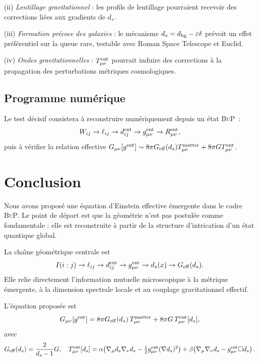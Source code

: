 \documentclass[11pt]{article}
\newcommand{\Geff}{G_{\rm eff}}
\newcommand{\BuP}{\textsc{BuP}}
\newcommand{\ent}{\rm ent}
\begin{document}
(ii) \textit{Lentillage gravitationnel} : les profils de lentillage pourraient recevoir
des corrections li\'ees aux gradients de $d_s$.

(iii) \textit{Formation pr\'ecoce des galaxies} : le m\'ecanisme $d_s=d_{\rm bg}-\varepsilon\delta$
pr\'evoit un effet pr\'ef\'erentiel sur la queue rare, testable avec Roman Space Telescope
et Euclid.

(iv) \textit{Ondes gravitationnelles} : $T_{\mu\nu}^{\ent}$ pourrait induire des
corrections \`a la propagation des perturbations m\'etriques cosmologiques.

\subsection{Programme num\'erique}

Le test d\'ecisif consistera \`a reconstruire num\'eriquement depuis un \'etat \BuP\ :
\[
W_{ij}\to\ell_{ij}\to d_{ij}^{\rm ent}\to g_{\mu\nu}^{\rm ent}\to R_{\mu\nu}^{\rm ent},
\]
puis \`a v\'erifier la relation effective
$G_{\mu\nu}[g^{\rm ent}]\sim 8\pi\Geff(d_s)T_{\mu\nu}^{\rm matter}+8\pi GT_{\mu\nu}^{\ent}$.

\section{Conclusion}
\label{sec:conclusion}

Nous avons propos\'e une \'equation d'Einstein effective \'emergente dans le cadre
\BuP. Le point de d\'epart est que la g\'eom\'etrie n'est pas postul\'ee comme
fondamentale : elle est reconstruite \`a partir de la structure d'intrication
d'un \'etat quantique global.

La cha\^{\i}ne g\'eom\'etrique centrale est
\[
I(i:j)
\rightarrow
\ell_{ij}
\rightarrow
d_{ij}^{\rm ent}
\rightarrow
g_{\mu\nu}^{\rm ent}
\rightarrow
d_s(x)
\rightarrow
\Geff(d_s).
\]
Elle relie directement l'information mutuelle microscopique \`a la m\'etrique \'emergente,
\`a la dimension spectrale locale et au couplage gravitationnel effectif.

L'\'equation propos\'ee est
\[
G_{\mu\nu}[g^{\rm ent}]
=
8\pi\Geff(d_s)\,T_{\mu\nu}^{\rm matter}
+
8\pi G\,T_{\mu\nu}^{\ent}[d_s],
\]
avec
\[
\Geff(d_s)=\frac{2}{d_s-1}G,
\quad
T_{\mu\nu}^{\ent}[d_s]
=\alpha\!\left(\nabla_\mu d_s\nabla_\nu d_s-\tfrac12 g_{\mu\nu}^{\rm ent}(\nabla d_s)^2\right)
+\beta\!\left(\nabla_\mu\nabla_\nu d_s-g_{\mu\nu}^{\rm ent}\Box d_s\right).
\]
\end{document}
